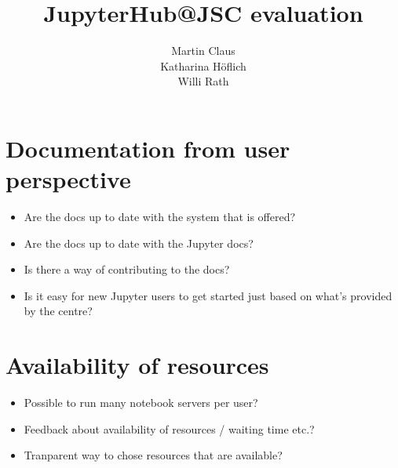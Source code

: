 \documentclass[11pt,a4paper]{article}
\title{\textbf{JupyterHub@JSC evaluation}}
\author{
  Martin Claus \\ %
	Katharina Höflich \\
	Willi Rath}
\begin{document}
\maketitle
\tableofcontents


%





\section{Documentation from user perspective}
\label{s-doc-from-user-pov}

\begin{itemize}
	\item Are the docs up to date with the system that is offered?
	\item Are the docs up to date with the Jupyter docs?
	\item Is there a way of contributing to the docs?
	\item Is it easy for new Jupyter users to get started just based on what's provided by the centre?
\end{itemize}





\section{Availability of resources}
\label{s-availability-resources}

\begin{itemize}
  \item Possible to run many notebook servers per user?
  \item Feedback about availability of resources / waiting time etc.?
  \item Tranparent way to chose resources that are available?
\end{itemize}
\end{document}
